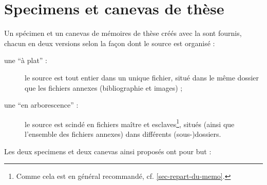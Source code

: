 \chapter{Specimens et canevas de thèse}\label{cha-specimen-canevas}%

Un spécimen et un canevas de mémoires de thèse créés avec la \yatcl sont
fournis, chacun en deux versions selon la façon dont le source  est
organisé :
\begin{description}
\item[une \enquote{à plat} :] le source est tout entier dans un unique fichier,
  situé dans le même dossier que les fichiers annexes (bibliographie et
  images) ;
\item[une \enquote{en arborescence} :] le source est scindé en fichiers maître
  et esclaves\footnote{Comme cela est en général recommandé,
    cf. \vref{sec-repart-du-memo}.}, situés (ainsi que l'ensemble des fichiers
  annexes) dans différents (sous-)dossiers.
\end{description}
Les deux specimens et deux canevas ainsi proposés ont pour but :

